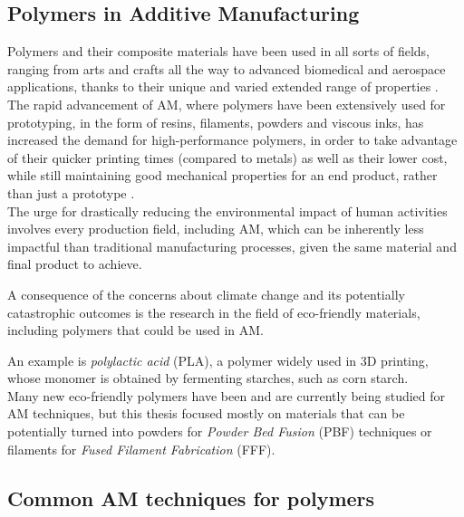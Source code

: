 \documentclass{article}
\begin{document}
    \subsection{Polymers in Additive Manufacturing\label{Polymers_in_AM}}

    Polymers and their composite materials have been used in all sorts of fields, ranging from arts and crafts all the way to advanced biomedical and aerospace applications, thanks 
    to their unique and varied extended range of properties \autocites{Recent_progress_polymers_AM,Latvian_additive,Materials_add_man_718,Messori_Bondioli_PHAs,doi:10.1063/1.4918516,SLS_3dprinting_biomedical_polymers,Kovalcik_PHA_Review}. \\  
    
    The rapid advancement of AM, where polymers have been extensively used for prototyping, in the form of resins, filaments, powders and viscous inks, 
    has increased the demand for high-performance polymers, in order to take advantage of their quicker printing times (compared to metals) as well as their lower cost, while still
    maintaining good mechanical properties for an end product, rather than just a prototype \autocite*{Recent_progress_polymers_AM}. \\ 

    The urge for drastically reducing the environmental impact of human activities involves every production field, including AM, which can be inherently less impactful
    than traditional manufacturing processes, given the same material and final product to achieve. 

    A consequence of the concerns about climate change and its potentially catastrophic outcomes is the research in the field of eco-friendly materials, including polymers 
    that could be used in AM. 
    
    An example is \textit{polylactic acid} (PLA), a polymer widely used in 3D printing, whose monomer is obtained by fermenting starches, such as corn starch. \\ 

    Many new eco-friendly polymers have been and are currently being studied for AM techniques, but this thesis focused mostly on materials that can be potentially turned 
    into powders for \textit{Powder Bed Fusion} (PBF) techniques or filaments for \textit{Fused Filament Fabrication} (FFF). 
    
    \subsection{Common AM techniques for polymers\label{AM_techniques_summary}}
    
\end{document}
